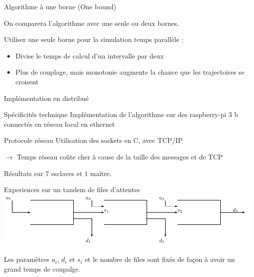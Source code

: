 \documentclass[10pt,usenames,dvipsnames]{beamer}
\begin{document}
\begin{frame}{Algorithme à une borne (One bound) }

On comparera l'algorithme avec une seule ou deux bornes.
\vspace{1cm}

Utiliser une seule borne pour la simulation temps parallèle :
\begin{itemize}
\item Divise le temps de calcul d'un intervalle par deux
\item Plus de couplage, mais monotonie augmente la chance que les trajectoires se croisent
\end{itemize}
\end{frame}


\begin{frame}{Implémentation en distribué }
\begin{block}{Spécificités technique}
Implémentation de l'algorithme sur des raspberry-pi 3 b connectés en réseau local en ethernet
\end{block}

\begin{block}{Protocole réseau}
Utilisation des sockets en C, avec TCP/IP

$\rightarrow$  Temps réseau coûte cher à cause de la taille des messages et de TCP
\end{block}

    Résultats sur $7$ esclaves et $1$ maître.
	   
\end{frame}


\begin{frame}{Experiences sur un tandem de files d'attentes}
  \centering
    \includegraphics [width=\textwidth]{tandem} 
    
    Les paramètres $a_i$, $d_i$ et $s_i$ et le nombre de files sont fixés de façon à avoir un grand temps de coupalge.
    

  \end{frame}
  
\end{document}
